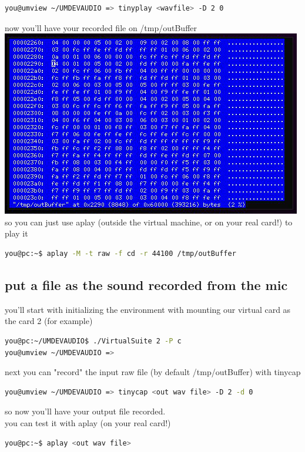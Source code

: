 \documentclass[a4paper,12pt]{article}
\begin{document}
	\begin{lstlisting}[frame=double, language=Bash]
you@umview ~/UMDEVAUDIO => tinyplay <wavfile> -D 2 0
	\end{lstlisting}

	now you'll have your recorded file on /tmp/outBuffer\\
	\includegraphics[scale=0.90]{hexer_done.png}
	so you can just use aplay (outside the virtual machine, or on your real card!) to play it

	\begin{lstlisting}[frame=double, language=Bash]
you@pc:~$ aplay -M -t raw -f cd -r 44100 /tmp/outBuffer
	\end{lstlisting}

	\subsection{put a file as the sound recorded from the mic}
	you'll start with initializing the environment with mounting our virtual card as the card 2 (for example)
	\begin{lstlisting}[frame=double, language=Bash]
you@pc:~/UMDEVAUDIO$ ./VirtualSuite 2 -P c
you@umview ~/UMDEVAUDIO => 
	\end{lstlisting}
	next you can "record" the input raw file (by default /tmp/outBuffer) with tinycap

	\begin{lstlisting}[frame=double, language=Bash]
you@umview ~/UMDEVAUDIO => tinycap <out wav file> -D 2 -d 0
	\end{lstlisting}

	so now you'll have your output file recorded.\\
	you can test it with aplay (on your real card!)\\

	\begin{lstlisting}[frame=double, language=Bash]
you@pc:~$ aplay <out wav file>
	\end{lstlisting}
\end{document}
